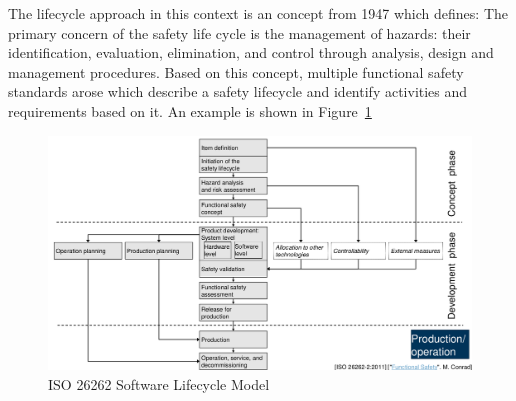 The lifecycle approach in this context is an concept from 1947 which defines: The primary concern of the safety life cycle is the management of hazards: their identification, evaluation, elimination, and control through analysis, design and management procedures.
Based on this concept, multiple functional safety standards arose which describe a safety lifecycle and identify activities and requirements based on it.
An example is shown in Figure~\ref{fig:iso26262_software_lifecycle}
\begin{figure}[h]
  \centering
  \includegraphics[width=.8\textwidth]{images/iso26262_software_lifecycle.png}
  \caption{ISO 26262 Software Lifecycle Model}\label{fig:iso26262_software_lifecycle}
\end{figure}

